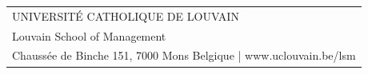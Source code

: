 \begin{titlepage}
    \centering
    \thispagestyle{empty} 

    \vspace{0.6cm}

    \begin{tcolorbox}[
        enhanced,
        colback=uclgold,
        colframe=uclgold,
        width=16.55cm,
        height=21.5cm, 
        arc=0pt, outer arc=0pt,
        boxsep=0pt, 
        left=1cm, 
        right=1cm, 
        top=1.2cm,
        bottom=0.2cm %
    ]

        
        \vfill %

        \begin{flushleft}
            \fontsize{9}{11}\selectfont %
            \selectfont %
            \color{white}
                \bigskip
                \bigskip
                \bigskip
                \bigskip
                \bigskip
                \bigskip
                \bigskip
                \bigskip
                \bigskip
                \bigskip
                \bigskip
                \bigskip
                \bigskip
                \bigskip
                \bigskip
                \bigskip
                \bigskip
                \bigskip
                \bigskip
                \bigskip
                \bigskip
                \bigskip
                \bigskip
                \bigskip
                \bigskip
                \bigskip
                \bigskip
                \bigskip
                \bigskip
                \bigskip
                \bigskip
                \bigskip
                \bigskip
                \bigskip
                \bigskip
                \bigskip
                \bigskip
                \bigskip
                \bigskip
                \bigskip
                \bigskip
                \bigskip
                \bigskip
            \begin{tabular}{@{}l} %
                UNIVERSITÉ CATHOLIQUE DE LOUVAIN \\
                Louvain School of Management \\
                Chaussée de Binche 151, 7000 Mons Belgique | www.uclouvain.be/lsm
            \end{tabular}
        \end{flushleft}
        
    \end{tcolorbox}
\end{titlepage}
